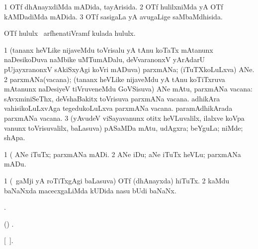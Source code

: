 \bentry
{}
\gl{\gu}
\bmng
\bnum
\num{1} OTf dhAnayxdiMda mADida, tayArisida. 
\num{2} OTf hulilxniMda yA OTf kAMDadiMda mADida. 
\num{3} OTf sasigaLa yA avugaLige saMbaMdhisida. 
\enum
\emng
\eentry

\bentry
{}
\gl{\nA}
\bmng
OTf hululx \kanmu\ arfhenatiVramf kulada hululx. 
\emng
\eentry

\bentry
{}
\gl{\nA}
\bmng
\bnum
\num{1} (tananx heVLike nijaveMdu toVrisalu yA tAnu koTaTx mAtanunx naDesikoDuva naMbike uMTumADalu, deVvaranonxV yArAdarU pUjayxranonxV sAkiSxyAgi koVri mADuva) parxmANa; (iTuTXkoLuLxva) ANe. 
\num{2} parxmANa(vacana); (tananx heVLike nijaveMdu yA tAnu koTiTxruva mAtanunx naDesiyeV tiVruveneMdu GoVSisuva) ANe mAtu, parxmANa vacana:  sAvxminiSeThx, deVshaBakitx toVrisuva parxmANa vacana.  adhikAra vahisikoLuLxvAga tegedukoLuLxva parxmANa vacana.  paramAdhikArada parxmANa vacana. 
\num{3} (yAvudeV viSayavanunx otitx heVLuvalilx, ilalxve koVpa \mo vanunx toVrisuvalilx, baLasuva) pASaMDa mAtu, udAgxra; beYguLa; niMde; shApa. 
\enum
\emng

\noindent
\gl{\pagu}
\bmng
\bnum
\num{1}  (  ANe iTuTx; parxmANa mADi. 
\num{2}  ANe iDu; aNe iTuTx heVLu; parxmANa mADu. 
\enum
\emng
\eentry

\bentry
{}
\gl{\nA}
\bmng
\bnum
\num{1} (\kanmu\ gaMji yA roTiTxgAgi baLasuva) OTf (dhAnayxda) hiTuTx. 
\num{2} kaMdu baNaNxda macecxgaLiMda kUDida nasu bUdi baNaNx. 
\enum
\emng
\eentry

\bentry
{}
\gl{\saMkiSx}
\bmng
{}. 
\emng
\eentry

\bentry
{}
\gl{\saMkiSx}
\bmng
(\birx) . 
\emng
\eentry

\bentry
{}
\gl{\saMkiSx}
\bmng
{} [\Latin\ ]. 
\emng
\eentry

